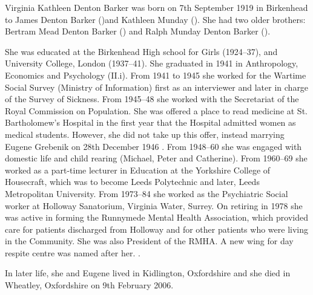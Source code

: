 
Virginia Kathleen Denton Barker was born on 7th September 1919 \cite{VKDBarkerManuscript} in Birkenhead to James Denton Barker ()and Kathleen Munday ().  She had two older brothers:  Bertram Mead Denton Barker () and Ralph Munday Denton Barker (). 

She was educated at the Birkenhead High school for Girls (1924--37), and University College, London (1937--41). She graduated in 1941 in Anthropology, Economics and Psychology (II.i). From 1941 to 1945 she worked for the Wartime Social Survey (Ministry of Information) first as an interviewer and later in charge of the Survey of Sickness. From 1945--48 she worked with the Secretariat of the Royal Commission on Population. She was offered a place to read medicine at St. Bartholomew's Hospital in the first year that the Hospital admitted women as medical students. However, she did not take up this offer, instead marrying Eugene Grebenik on 28th December 1946 \cite{VKDBarkerManuscript}. From 1948--60 she was engaged with domestic life and child rearing  (Michael, Peter and Catherine). From 1960--69 she worked as a part-time lecturer in Education at the Yorkshire College of Housecraft, which was to become Leeds Polytechnic and later, Leeds Metropolitan University. From 1973--84 she worked as the Psychiatric Social worker at Holloway Sanatorium, Virginia Water, Surrey. On retiring in 1978 she was active in forming the Runnymede Mental Health Association, which provided care for patients discharged from Holloway and for other patients who were living in the Community. She was also President of the RMHA. A new wing for day respite centre was named after her. \cite{VirginiaDocs}.

In later life, she and Eugene lived in Kidlington, Oxfordshire and she died in Wheatley, Oxfordshire  on 9th February 2006.
